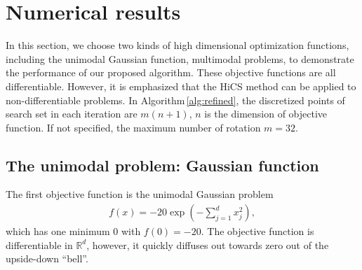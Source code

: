\documentclass[final,1p,times]{elsarticle}
\def\bbR{\mathbb{R}}
\begin{document}


\section{Numerical results}
\label{sec:experiment}

In this section, we choose two kinds of high dimensional optimization functions,
including the unimodal Gaussian function, multimodal problems,
to demonstrate the performance of our proposed algorithm. 
These objective functions are all differentiable. However, it is
emphasized that the HiCS method can be applied to non-differentiable problems. 
In Algorithm\,\ref{alg:refined}, the discretized points of 
search set in each iteration are $m(n+1)$, $n$ is the dimension
of objective function. If not specified, the maximum number of
rotation $m=32$.

\subsection{The unimodal problem: Gaussian function}
\label{subsec:gauss}

The first objective function is the unimodal Gaussian problem
\begin{align}
	f(x) = -20\exp\left(-\sum_{j=1}^d x_j^2 \right),
	\label{eqn:exp1}
\end{align}
which has one minimum $0$ with $f(0)=-20$.
The objective function is differentiable in $\bbR^d$, however,
it quickly diffuses out towards zero out of the upside-down ``bell''. 
\end{document}
